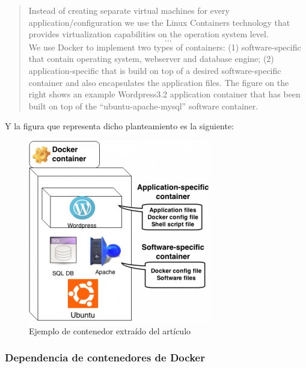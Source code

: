             \begin{quote}

                Instead of creating separate virtual machines for every application/configuration we use the Linux Containers technology that provides virtualization capabilities on the operation system level. \[...\] We use Docker to implement two types of containers: (1) software-specific that contain operating system, webserver and database engine; (2) application-specific that is build on top of a desired software-specific container and also encapsulates the application files. The figure on the right shows an example Wordpress3.2 application container that has been built on top of the “ubuntu-apache-mysql” software container.

            \end{quote}

            Y la figura que representa dicho planteamiento es la siguiente:

            \begin{figure}[htbp]
                \centering

                \includegraphics[scale=0.75]{images/Diagramas/Articulo.png}

                \caption{Ejemplo de contenedor extraído del artículo \cite{securitylab-malware-analysis}}
                \label{fig:articulo}
            \end{figure}

            \newpage
                
            \subsubsection{Dependencia de contenedores de Docker}

